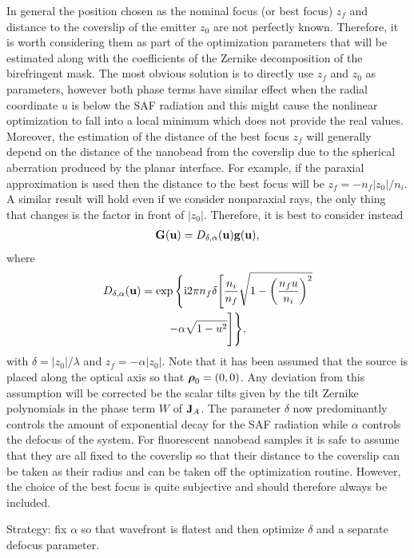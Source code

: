 \documentclass[reprint,aps,pra,superscriptaddress,
amsmath,amssymb]{revtex4-1}
\begin{document}
In general the position chosen as the nominal focus (or best focus) $z_f$ and 
distance to the coverslip of the emitter $z_0$ are not perfectly 
known. Therefore,
it is worth considering them as part of the optimization parameters that 
will be estimated along with the coefficients of the Zernike decomposition 
of the birefringent mask. The most obvious solution is to directly 
use $z_f$ and $z_0$ as parameters, however both phase 
terms have similar effect when the 
radial coordinate $u$ is below the SAF radiation and this might cause the 
nonlinear optimization to fall into a local minimum which does not provide
the real values.
Moreover, the estimation 
of the distance of the best focus $z_f$ will generally depend on the distance 
of the nanobead from the coverslip due to the spherical aberration
produced by the planar interface. For example, if the paraxial 
approximation is used then the distance to the best focus will be 
$z_f = -n_f |z_0| /n_i$. A similar result will hold even if we consider 
nonparaxial rays, the only thing that changes 
is the factor in front of $|z_0|$. Therefore, it is best to 
consider instead
\begin{align}
\textbf G (\textbf u)  = D_{\delta, \alpha} (\textbf u) \textbf g(\textbf u),
\end{align}
where
\begin{multline}
D_{\delta, \alpha} (\textbf u)= \exp \Bigg\{  
  \text{i} 2 \pi n_f  \delta \Bigg[ \frac{n_i}{n_f} 
  \sqrt{1 - \left(\frac{n_f u}{n_i} \right)^2 }  \\
- \alpha \sqrt{1 - u^2} \Bigg] \Bigg\} , 
\end{multline}
with $\delta = |z_0| / \lambda$ and $z_f = -\alpha |z_0|$. 
Note that it has been assumed that the source is placed  
along the optical axis so that $\boldsymbol \rho_0 = (0,0)$. 
Any deviation from this assumption will be corrected be the scalar tilts 
given by the tilt Zernike polynomials in the phase term $W$ of $\textbf J_A$.
The parameter $\delta$ now predominantly controls the amount of exponential 
decay for the SAF radiation while $\alpha$ controls the defocus of the system. 
For fluorescent nanobead samples it is safe to 
assume that they are all fixed to the coverslip so that their distance to the 
coverslip can be taken as their radius and can be taken off the optimization
routine.  However, the choice of the best focus is quite subjective and should 
therefore always be included.

Strategy: fix $\alpha$ so that wavefront is flatest  and then optimize $\delta$ 
and a separate defocus parameter.
\end{document}
